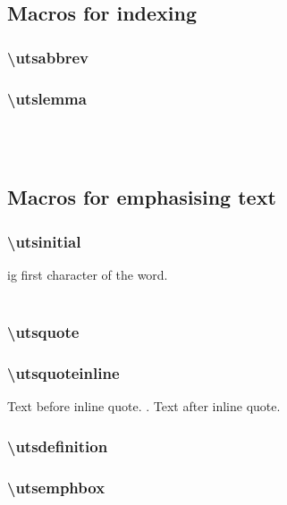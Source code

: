 \subsection{Macros for indexing}
\subsubsection{\textbackslash utsabbrev}

\subsubsection{\textbackslash utslemma}
\\
\\



\subsection{Macros for emphasising text}

\subsubsection{\textbackslash utsinitial}
ig first character of the word.
\\
\\


\subsubsection{\textbackslash utsquote}


\subsubsection{\textbackslash utsquoteinline}
Text before inline quote. . Text after inline quote.


\subsubsection{\textbackslash utsdefinition}


\subsubsection{\textbackslash utsemphbox}


